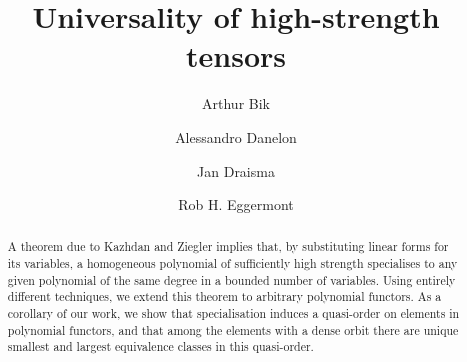 \documentclass{amsart}
\theoremstyle{plain}
\theoremstyle{definition}
\begin{document}
\title{Universality of high-strength tensors}

\author{Arthur Bik}
\address{MPI for Mathematics in the Sciences, Leipzig, Germany}

\author{Alessandro Danelon}
\address{Eindhoven University of Technology, The Netherlands}

\author{Jan Draisma}
\address{University of Bern, Switzerland, and Eindhoven University of Technology, The Netherlands}

\author{Rob H. Eggermont}
\address{Eindhoven University of Technology, The Netherlands}

\let\thefootnote\relax
{}

\maketitle


\begin{abstract}
A theorem due to Kazhdan and Ziegler implies that, by substituting linear
forms for its variables, a homogeneous polynomial of sufficiently high
strength specialises to any given polynomial of the same degree in a
bounded number of variables. Using entirely different techniques,
we extend this theorem to arbitrary polynomial functors.  As a
corollary of our work, we show that specialisation induces a quasi-order
on elements in polynomial functors, and that among the 
elements with a dense orbit there are unique smallest and
largest equivalence classes in this quasi-order.
\end{abstract}
\end{document}
